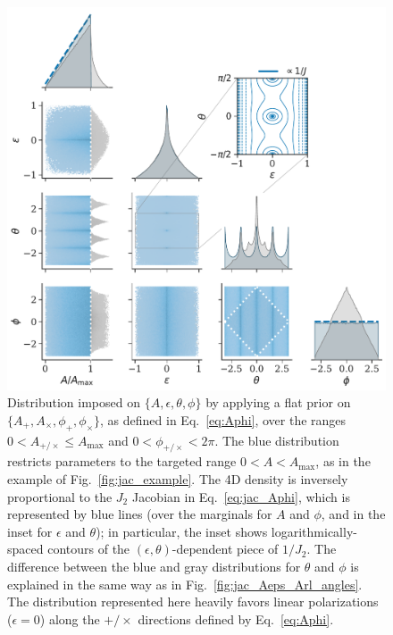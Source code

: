 \documentclass[aps,prd,twocolumn,superscriptaddress,preprintnumbers,floatfix,nofootinbib]{revtex4-2}
\newcommand*{\eq}[1]{Eq.~\eqref{eq:#1}}
\begin{document}
\begin{figure}
\includegraphics[width=\columnwidth]{jac_Aeps_Apc_corner}
\caption{Distribution imposed on $\{A,\epsilon, \theta, \phi\}$ by applying a flat prior on $\{A_+,A_\times, \phi_+, \phi_\times\}$, as defined in \eq{Aphi}, over the ranges $0 < A_{+/\times} \leq A_{\max}$ and $0 < \phi_{+/\times} < 2\pi$.
The blue distribution restricts parameters to the targeted range $0 < A < A_{\max}$, as in the example of Fig.~\ref{fig:jac_example}.
The 4D density is inversely proportional to the $J_2$ Jacobian in \eq{jac_Aphi}, which is represented by blue lines (over the marginals for $A$ and $\phi$, and in the inset for $\epsilon$ and $\theta$); in particular, the inset shows logarithmically-spaced contours of the $(\epsilon,\theta)$-dependent piece of $1/J_2$.
The difference between the blue and gray distributions for $\theta$ and $\phi$ is explained in the same way as in Fig.~\ref{fig:jac_Aeps_Arl_angles}.
The distribution represented here heavily favors linear polarizations ($\epsilon = 0$) along the $+/\times$ directions defined by \eq{Aphi}.
}
\label{fig:jac_Aphi}
\end{figure}
\end{document}
